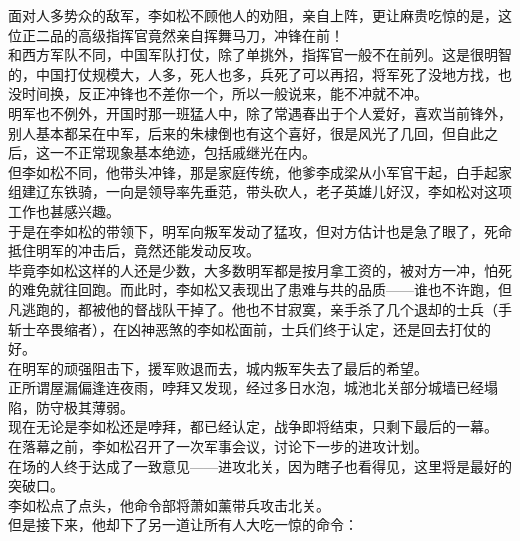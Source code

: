 \begin{multicols}{\theparacolNo}
面对人多势众的敌军，李如松不顾他人的劝阻，亲自上阵，更让麻贵吃惊的是，这位正二品的高级指挥官竟然亲自挥舞马刀，冲锋在前！\\

和西方军队不同，中国军队打仗，除了单挑外，指挥官一般不在前列。这是很明智的，中国打仗规模大，人多，死人也多，兵死了可以再招，将军死了没地方找，也没时间换，反正冲锋也不差你一个，所以一般说来，能不冲就不冲。\\

明军也不例外，开国时那一班猛人中，除了常遇春出于个人爱好，喜欢当前锋外，别人基本都呆在中军，后来的朱棣倒也有这个喜好，很是风光了几回，但自此之后，这一不正常现象基本绝迹，包括戚继光在内。\\

但李如松不同，他带头冲锋，那是家庭传统，他爹李成梁从小军官干起，白手起家组建辽东铁骑，一向是领导率先垂范，带头砍人，老子英雄儿好汉，李如松对这项工作也甚感兴趣。\\

于是在李如松的带领下，明军向叛军发动了猛攻，但对方估计也是急了眼了，死命抵住明军的冲击后，竟然还能发动反攻。\\

毕竟李如松这样的人还是少数，大多数明军都是按月拿工资的，被对方一冲，怕死的难免就往回跑。而此时，李如松又表现出了患难与共的品质——谁也不许跑，但凡逃跑的，都被他的督战队干掉了。他也不甘寂寞，亲手杀了几个退却的士兵（手斩士卒畏缩者），在凶神恶煞的李如松面前，士兵们终于认定，还是回去打仗的好。\\

在明军的顽强阻击下，援军败退而去，城内叛军失去了最后的希望。\\

正所谓屋漏偏逢连夜雨，哱拜又发现，经过多日水泡，城池北关部分城墙已经塌陷，防守极其薄弱。\\

现在无论是李如松还是哱拜，都已经认定，战争即将结束，只剩下最后的一幕。\\

在落幕之前，李如松召开了一次军事会议，讨论下一步的进攻计划。\\

在场的人终于达成了一致意见——进攻北关，因为瞎子也看得见，这里将是最好的突破口。\\

李如松点了点头，他命令部将萧如薰带兵攻击北关。\\

但是接下来，他却下了另一道让所有人大吃一惊的命令：\\


\end{multicols}
